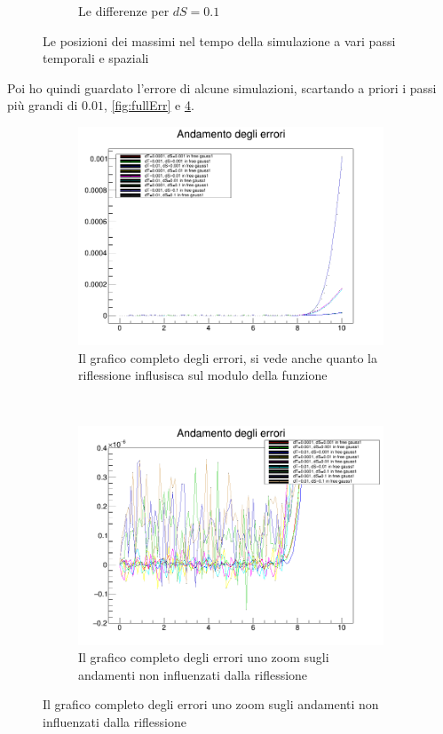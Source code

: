 \begin{figure}[htb]
\begin{subfigure}[b]{0.3\textwidth}
\caption[Differenze in 0.1]{Le differenze per $dS = 0.1$}
\end{subfigure}
\caption{Le posizioni dei massimi nel tempo della simulazione a vari passi temporali  e spaziali}\label{fig:velocita}
\end{figure}

Poi ho quindi guardato l'errore di alcune simulazioni, scartando a priori i passi pi\`u grandi di $0.01$, \autoref{fig:fullErr} e \ref{fig:fullErrzoom}.

\begin{figure}[htb]
\centering
\begin{subfigure}[b]{0.49\textwidth}
\includegraphics[width=\linewidth]{IMG/e_g1full}
\caption[Errori completo]{Il grafico completo degli errori, si vede anche quanto la riflessione influsisca sul modulo della funzione}\label{fig:fullErr}
\end{subfigure}
~
\begin{subfigure}[b]{0.49\textwidth}
	\includegraphics[width=\linewidth]{IMG/e_g1res}
	\caption[Errori zoom]{Il grafico completo degli errori uno zoom sugli andamenti non influenzati dalla riflessione}\label{fig:fullErrzoom}
\end{subfigure}
\end{figure}

